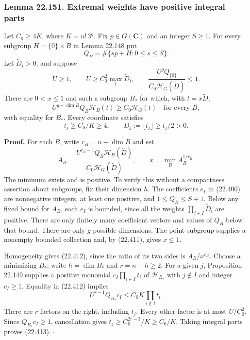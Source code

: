 \documentclass[
  11pt,
  a4paper,
]{article}
\newcounter{none} %
\begin{document}
\subsubsection{Lemma 22.151. Extremal weights have positive integral
parts}\label{lemma-22.151.-extremal-weights-have-positive-integral-parts}

Let \(C_0\ge4K\), where \(K=n!\,3^g\). Fix \(p\in G(\mathbf C)\) and an
integer \(S\ge1\). For every subgroup \(H=\{0\}\times B\) in Lemma
22.148 put \[
 Q_B=\#\{sp+H:0\le s\le S\}.
 \tag{22.410}
\] Let \(\widetilde D_i>0\), and suppose \[
 U\ge1,\qquad U\ge C_0^2\max_i\widetilde D_i,\qquad
 \frac{U^g Q_{\{0\}}}
      {C_0\mathcal H_G(\widetilde D)}\le1.
 \tag{22.411}
\] There are \(0<x\le1\) and such a subgroup \(B_*\) for which, with
\(t=x\widetilde D\), \[
 U^{g-\dim B}Q_B\mathcal H_B(t)\ge C_0\mathcal H_G(t)
 \quad\text{for every }B,
 \tag{22.412}
\] with equality for \(B_*\). Every coordinate satisfies \[
 t_j\ge C_0/K\ge4,\qquad
 D_j:=\lfloor t_j\rfloor\ge t_j/2>0.
 \tag{22.413}
\]

\textbf{Proof.} For each \(B\), write \(r_B=n-\dim B\) and set \[
 A_B=\frac{U^{r_B-1}Q_B\mathcal H_B(\widetilde D)}
                 {C_0\mathcal H_G(\widetilde D)},\qquad
 x=\min_B A_B^{1/r_B}.
 \tag{22.414}
\] The minimum exists and is positive. To verify this without a
compactness assertion about subgroups, fix their dimension \(h\). The
coefficients \(e_I\) in (22.400) are nonnegative integers, at least one
positive, and \(1\le Q_B\le S+1\). Below any fixed bound for \(A_B\),
each \(e_I\) is bounded, since all the weights
\(\prod_{i\in I}\widetilde D_i\) are positive. There are only finitely
many coefficient vectors and values of \(Q_B\) below that bound. There
are only \(g\) possible dimensions. The point subgroup supplies a
nonempty bounded collection and, by (22.411), gives \(x\le1\).

Homogeneity gives (22.412), since the ratio of its two sides is
\(A_B/x^{r_B}\). Choose a minimizing \(B_*\); write \(h=\dim B_*\) and
\(r=n-h\ge2\). For a given \(j\), Proposition 22.149 supplies a positive
monomial \(c_I\prod_{i\in I}t_i\) of \(\mathcal H_{B_*}\) with
\(j\notin I\) and integer \(c_I\ge1\). Equality in (22.412) implies \[
 U^{r-1}Q_{B_*}c_I
       \le C_0K\prod_{i\notin I}t_i.
 \tag{22.415}
\] There are \(r\) factors on the right, including \(t_j\). Every other
factor is at most \(U/C_0^2\). Since \(Q_{B_*}c_I\ge1\), cancellation
gives \(t_j\ge C_0^{2r-3}/K\ge C_0/K\). Taking integral parts proves
(22.413). \(\square\)
\end{document}
